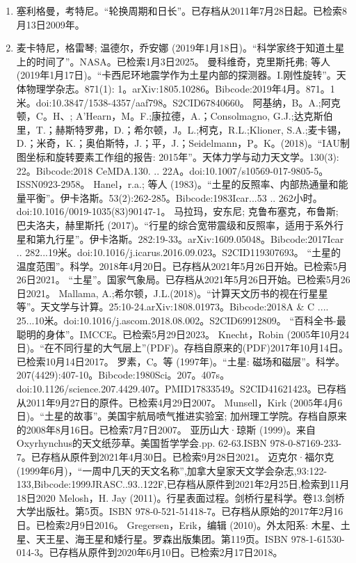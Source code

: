 \begin{enumerate}
\item 塞利格曼，考特尼。“轮换周期和日长”。已存档从2011年7月28日起。已检索8月13日2009年。
\item 麦卡特尼，格雷琴; 温德尔，乔安娜 (2019年1月18日)。“科学家终于知道土星上的时间了”。NASA。已检索1月3日2025。
 曼科维奇，克里斯托弗; 等人 (2019年1月17日)。“卡西尼环地震学作为土星内部的探测器。I.刚性旋转”。天体物理学杂志。871(1): 1。arXiv:1805.10286。Bibcode:2019年4月。871。1米。doi:10.3847/1538-4357/aaf798。S2CID67840660。 
 阿基纳，B。A.;阿克顿，C。H、; A'Hearn，M。F.;康拉德，A.；Consolmagno, G.J.;达克斯伯里，T.；赫斯特罗弗，D.；希尔顿，J。L.;柯克，R.L.;Klioner, S.A.;麦卡锡，D.；米奇，K.；奥伯斯特，J.；平，J.；Seidelmann，P。K。(2018)。“IAU制图坐标和旋转要素工作组的报告: 2015年”。天体力学与动力天文学。130(3): 22。Bibcode:2018 CeMDA.130. .. 22A。doi:10.1007/s10569-017-9805-5。ISSN0923-2958。 
 Hanel，r.a.; 等人 (1983)。“土星的反照率、内部热通量和能量平衡”。伊卡洛斯。53(2):262-285。Bibcode:1983Icar...53 .. 262小时。doi:10.1016/0019-1035(83)90147-1。
 马拉玛，安东尼; 克鲁布塞克，布鲁斯; 巴夫洛夫，赫里斯托 (2017)。“行星的综合宽带震级和反照率，适用于系外行星和第九行星”。伊卡洛斯。282:19-33。arXiv:1609.05048。Bibcode:2017Icar .. 282...19米。doi:10.1016/j.icarus.2016.09.023。S2CID119307693。 
 “土星的温度范围”。科学。2018年4月20日。已存档从2021年5月26日开始。已检索5月26日2021。
 “土星”。国家气象局。已存档从2021年5月26日开始。已检索5月26日2021。
 Mallama, A.;希尔顿，J.L.(2018)。“计算天文历书的视在行星星等”。天文学与计算。25:10-24.arXiv:1808.01973。Bibcode:2018A & C .... 25...10米。doi:10.1016/j.ascom.2018.08.002。S2CID69912809。 
 “百科全书-最聪明的身体”。IMCCE。已检索5月29日2023。
 Knecht，Robin (2005年10月24日)。“在不同行星的大气层上”(PDF)。存档自原来的(PDF)2017年10月14日。已检索10月14日2017。
 罗素，C。等 (1997年)。“土星: 磁场和磁层”。科学。207(4429):407-10。Bibcode:1980Sci。207。407s。doi:10.1126/science.207.4429.407。PMID17833549。S2CID41621423。已存档从2011年9月27日的原件。已检索4月29日2007。  
 Munsell，Kirk (2005年4月6日)。“土星的故事”。美国宇航局喷气推进实验室; 加州理工学院。存档自原来的2008年8月16日。已检索7月7日2007。
 亚历山大·琼斯 (1999)。来自Oxyrhynchus的天文纸莎草。美国哲学学会.pp. 62-63.ISBN 978-0-87169-233-7。已存档从原件到2021年4月30日。已检索9月28日2021。
 迈克尔·福尔克 (1999年6月)，“一周中几天的天文名称”,加拿大皇家天文学会杂志,93:122-133,Bibcode:1999JRASC..93..122F,已存档从原件到2021年2月25日,检索到11月18日2020
 Melosh，H. Jay (2011)。行星表面过程。剑桥行星科学。卷13.剑桥大学出版社。第5页。ISBN 978-0-521-51418-7。已存档从原始的2017年2月16日。已检索2月9日2016。
 Gregersen，Erik，编辑 (2010)。外太阳系: 木星、土星、天王星、海王星和矮行星。罗森出版集团。第119页。ISBN 978-1-61530-014-3。已存档从原件到2020年6月10日。已检索2月17日2018。

\end{enumerate}
